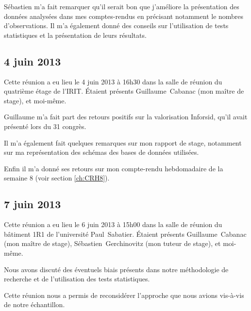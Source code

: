 	Sébastien m'a fait remarquer qu'il serait bon que j'améliore la présentation des données analysées dans mes comptes-rendus en précisant notamment le nombres d'observations. Il m'a également donné des conseils sur l'utilisation de tests statistiques et la présentation de leurs résultats.
	
	
	\subsection{4 juin 2013}
		Cette réunion a eu lieu le 4 juin 2013 à 16h30 dans la salle de réunion du quatrième étage de l'IRIT. Étaient présents Guillaume~Cabanac (mon maître de stage), et moi-même.
		
		Guillaume m'a fait part des retours positifs sur la valorisation Inforsid, qu'il avait présenté lors du 31 congrès.
		
		Il m'a également fait quelques remarques sur mon rapport de stage, notamment sur ma représentation des schémas des bases de données utilisées.
		
		Enfin il m'a donné ses retours sur mon compte-rendu hebdomadaire de la semaine 8 (voir section \ref{ch:CRH8}).
	
	
	\subsection{7 juin 2013}
		Cette réunion a eu lieu le 6 juin 2013 à 15h00 dans la salle de réunion du bâtiment 1R1 de l'université Paul~Sabatier. Étaient présents Guillaume~Cabanac (mon maître de stage), Sébastien~Gerchinovitz (mon tuteur de stage), et moi-même.
		
		Nous avons discuté des éventuels biais présents dans notre méthodologie de recherche et de l'utilisation des tests statistiques.
		
		Cette réunion nous a permis de reconsidérer l'approche que nous avions vis-à-vis de notre échantillon.
	
	
	
